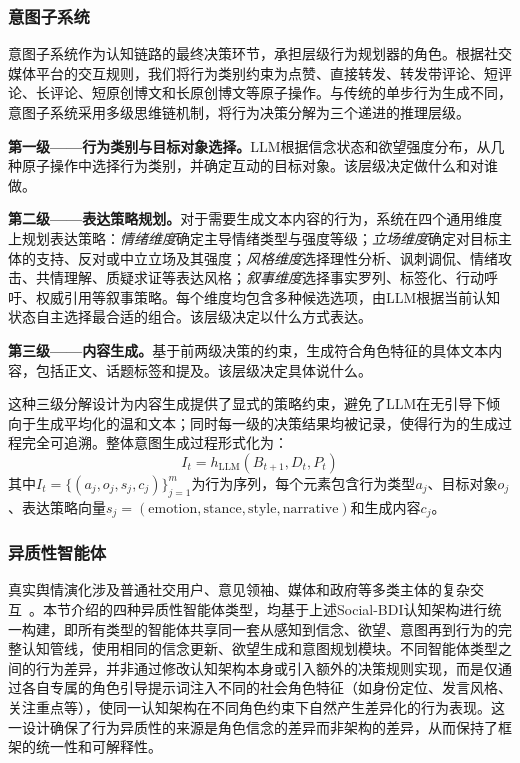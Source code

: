 \documentclass[a4paper,fleqn]{cas-dc}
\begin{document}
\subsubsection{意图子系统}

意图子系统作为认知链路的最终决策环节，承担层级行为规划器的角色。根据社交媒体平台的交互规则，我们将行为类别约束为点赞、直接转发、转发带评论、短评论、长评论、短原创博文和长原创博文等原子操作。与传统的单步行为生成不同，意图子系统采用多级思维链机制，将行为决策分解为三个递进的推理层级。

\textbf{第一级——行为类别与目标对象选择。}LLM根据信念状态和欲望强度分布，从几种原子操作中选择行为类别，并确定互动的目标对象。该层级决定做什么和对谁做。

\textbf{第二级——表达策略规划。}对于需要生成文本内容的行为，系统在四个通用维度上规划表达策略：\textit{情绪维度}确定主导情绪类型与强度等级；\textit{立场维度}确定对目标主体的支持、反对或中立立场及其强度；\textit{风格维度}选择理性分析、讽刺调侃、情绪攻击、共情理解、质疑求证等表达风格；\textit{叙事维度}选择事实罗列、标签化、行动呼吁、权威引用等叙事策略。每个维度均包含多种候选选项，由LLM根据当前认知状态自主选择最合适的组合。该层级决定以什么方式表达。

\textbf{第三级——内容生成。}基于前两级决策的约束，生成符合角色特征的具体文本内容，包括正文、话题标签和提及。该层级决定具体说什么。

这种三级分解设计为内容生成提供了显式的策略约束，避免了LLM在无引导下倾向于生成平均化的温和文本；同时每一级的决策结果均被记录，使得行为的生成过程完全可追溯。整体意图生成过程形式化为：
\begin{equation}
I_t = h_{\text{LLM}}(B_{t+1}, D_t, P_t)
\end{equation}
其中$I_t = \{(a_j, o_j, s_j, c_j)\}_{j=1}^{m}$为行为序列，每个元素包含行为类型$a_j$、目标对象$o_j$、表达策略向量$s_j = (\text{emotion}, \text{stance}, \text{style}, \text{narrative})$和生成内容$c_j$。

\subsubsection{异质性智能体}

真实舆情演化涉及普通社交用户、意见领袖、媒体和政府等多类主体的复杂交互~\citep{chen_evolution_2025,wu_public_2023}。本节介绍的四种异质性智能体类型，均基于上述Social-BDI认知架构进行统一构建，即所有类型的智能体共享同一套从感知到信念、欲望、意图再到行为的完整认知管线，使用相同的信念更新、欲望生成和意图规划模块。不同智能体类型之间的行为差异，并非通过修改认知架构本身或引入额外的决策规则实现，而是仅通过各自专属的角色引导提示词注入不同的社会角色特征（如身份定位、发言风格、关注重点等），使同一认知架构在不同角色约束下自然产生差异化的行为表现。这一设计确保了行为异质性的来源是角色信念的差异而非架构的差异，从而保持了框架的统一性和可解释性。
\end{document}
